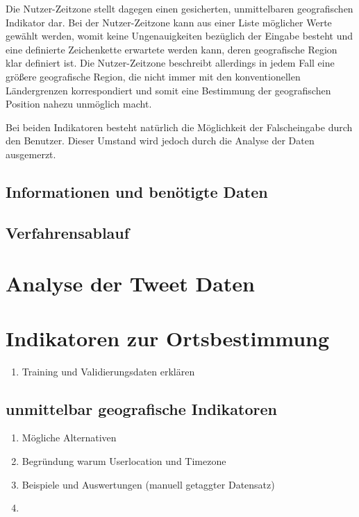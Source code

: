 	Die Nutzer-Zeitzone stellt dagegen einen gesicherten, unmittelbaren geografischen Indikator dar.
	Bei der Nutzer-Zeitzone kann aus einer Liste möglicher Werte gewählt werden, womit keine Ungenauigkeiten bezüglich der Eingabe besteht und eine definierte Zeichenkette erwartete werden kann, deren geografische Region klar definiert ist. 
	Die Nutzer-Zeitzone beschreibt allerdings in jedem Fall eine größere geografische Region, die nicht immer mit den konventionellen Ländergrenzen korrespondiert und somit eine Bestimmung der geografischen Position nahezu unmöglich macht.

	Bei beiden Indikatoren besteht natürlich die Möglichkeit der Falscheingabe durch den Benutzer. Dieser Umstand wird jedoch durch die Analyse der Daten ausgemerzt.  

	\subsection{Informationen und benötigte Daten}

	\subsection{Verfahrensablauf}


\section{Analyse der Tweet Daten}

\section{Indikatoren zur Ortsbestimmung}

	\begin{enumerate}
		\item{Training und Validierungsdaten erklären} 
	\end{enumerate}


	\subsection{unmittelbar geografische Indikatoren}
		\begin{enumerate}
			\item Mögliche Alternativen
			\item Begründung warum Userlocation und Timezone
			\item Beispiele und Auswertungen (manuell getaggter Datensatz)
			\item \cite{Hecht2011} 
		\end{enumerate}

